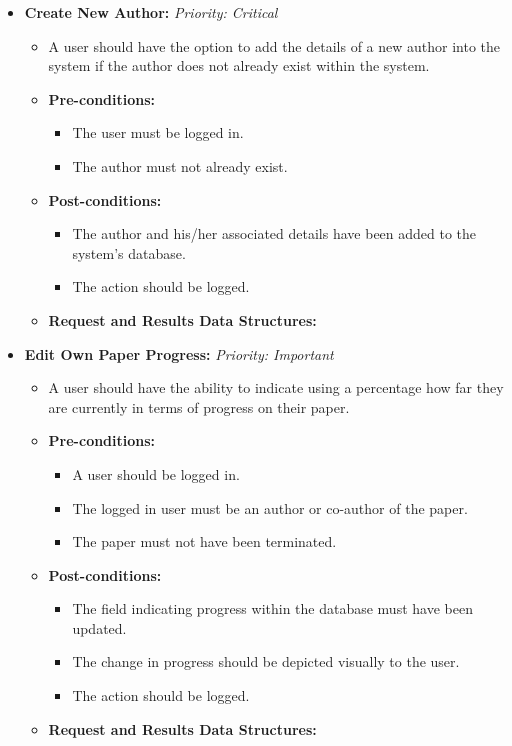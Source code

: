 \documentclass{article}
\begin{document}
\begin{itemize}
					\item \textbf{Create New Author:} \hfill \textit{Priority: Critical}
					\begin{itemize}
						\item A user should have the option to add the details of a new author into the system if the author does not already exist within the system.
						\item \textbf{Pre-conditions:}
						\begin{itemize}
							\item The user must be logged in.
							\item The author must not already exist. 
						\end{itemize}
						\item \textbf{Post-conditions:}
						\begin{itemize}
							\item The author and his/her associated details have been added to the system's database.
							\item The action should be logged.
						\end{itemize}
						\item \textbf{Request and Results Data Structures:}
					\end{itemize}
					
					\item \textbf{Edit Own Paper Progress:} \hfill \textit{Priority: Important}
					\begin{itemize}
						\item A user should have the ability to indicate using a percentage how far they are currently in terms of progress on their paper.
						\item \textbf{Pre-conditions:}
						\begin{itemize}
							\item A user should be logged in.
							\item The logged in user must be an author or co-author of the paper.
							\item The paper must not have been terminated.
						\end{itemize}
						\item \textbf{Post-conditions:}
						\begin{itemize}
							\item The field indicating progress within the database must have been updated.
							\item The change in progress should be depicted visually to the user.
							\item The action should be logged.
						\end{itemize}
						\item \textbf{Request and Results Data Structures:}
					\end{itemize}
					

\end{itemize}
\end{document}
